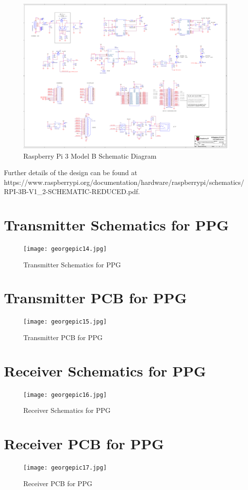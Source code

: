 \begin{figure}[H]
	\centering
	\includegraphics[width=1.25\linewidth,angle=90,origin=c]{RPI-3B.pdf}
	\caption{Raspberry Pi 3 Model B Schematic Diagram \cite{rpi3hardware}}
	\label{rpi3bschematic}
\end{figure}

Further details of the design can be found at \\ https://www.raspberrypi.org/documentation/hardware/raspberrypi/schematics/RPI-3B-V1\_2-SCHEMATIC-REDUCED.pdf.




\section{Transmitter Schematics for PPG}

\begin{figure}[H]
	\centering
	\texttt{[image: georgepic14.jpg]}
	\caption{Transmitter Schematics for PPG}
\end{figure}

\section{Transmitter PCB for PPG}

\begin{figure}[H]
	\centering
	\texttt{[image: georgepic15.jpg]}
	\caption{Transmitter PCB for PPG}
\end{figure}

\section{Receiver Schematics for PPG}

\begin{figure}[H]
	\centering
	\texttt{[image: georgepic16.jpg]}
	\caption{Receiver Schematics for PPG}
\end{figure}

\section{Receiver PCB for PPG}

\begin{figure}[H]
	\centering
	\texttt{[image: georgepic17.jpg]}
	\caption{Receiver PCB for PPG}
\end{figure}